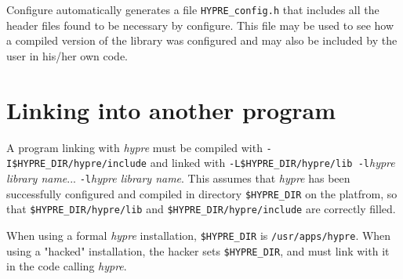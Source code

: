 Configure automatically generates a file 
\verb+HYPRE_config.h+ that includes all the
header files found to be necessary by configure.  This file may be used
to see how a compiled version of the library was configured and may also
be included by the user in his/her own code.

\section{Linking into another program}

A program linking with {\slshape hypre} must be compiled with
\verb+-I$HYPRE_DIR/hypre/include+ and linked with
\verb+-L$HYPRE_DIR/hypre/lib -l+{\itshape hypre library name}... 
\verb+-l+{\itshape hypre library name}.
This assumes that {\slshape hypre} has been
successfully configured and compiled in directory \verb+$HYPRE_DIR+
on the platfrom, so that \verb+$HYPRE_DIR/hypre/lib+
and \verb+$HYPRE_DIR/hypre/include+ are correctly filled.

When using a formal {\slshape hypre} installation, \verb+$HYPRE_DIR+ is
\verb+/usr/apps/hypre+.
When using a "hacked" installation, the hacker sets \verb+$HYPRE_DIR+,
and must link with it in the code calling {\slshape hypre}. 
